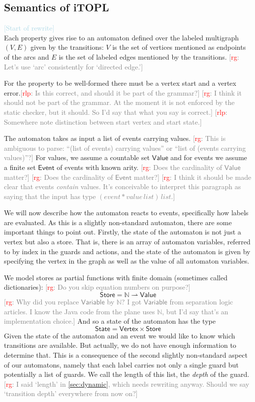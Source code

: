 \documentclass[preprint]{sigplanconf} %
\newcommand{\note}[2]{\textcolor{gray}{[\textcolor{red}{#1}: #2]}}
\newcommand{\rg}[1]{\note{rg}{#1}}
\newcommand{\rlp}[1]{\note{rlp}{#1}}
\newcommand{\N}{\ensuremath{\mathbb{N}}}
\newcommand{\pmap}{\rightharpoonup}
\newcommand{\set}[1]{\ensuremath{\mathsf{#1}}}
\theoremstyle{definition}
\theoremstyle{remark}
\begin{document}
\subsection{Semantics of iTOPL}\label{sec:semantics.itopl} %
\textcolor{lightblue}{[Start of rewrite]}\\
Each property gives rise to an automaton defined over the labeled multigraph $(V, E)$ given
by the transitions: $V$ is the set of vertices mentioned as endpoints of
the arcs and $E$ is the set of labeled edges mentioned by the
transitions.
\rg{Let's use `arc' consistently for `directed edge.'}

For the property to be well-formed there must be a vertex start and a
vertex error.\rlp{Is this correct, and should it be part of the grammar?}
\rg{I think it should not be part of the grammar.
At the moment it is not enforced by the static checker, but it should.
So I'd say that what you say is correct.}
\rlp{Somewhere note distinction between start vertex and start
  state.}

The automaton takes as input a list of events carrying values.
\rg{This is ambiguous to parse: ``(list of events) carrying values'' or ``list of (events carrying values)''?}
For values, we assume a countable set \set{Value} and for events we assume
a finite set \set{Event} of events with known arity.
\rg{Does the cardinality of \set{Value} matter?}
\rg{Does the cardinality of \set{Event} matter?}
\rg{I think it should be made clear that events \emph{contain} values.
It's conceivable to interpret this paragraph as saying that the input has type $(\mathit{event}*\mathit{value}\,\mathit{list})\,\mathit{list}$.}

We will now describe how the automaton reacts to events, specifically
how labels are evaluated. As this is a slightly non-standard
automaton, there are some important things to point out. Firstly, the
state of the automaton is not just a vertex but also a store. 
That is, there is an array of automaton variables, referred to by
index in the guards and actions, and the state of the automaton is
given by specifying the vertex in the graph as well as the value of
all automaton variables.

We model stores as partial functions with finite domain (sometimes called dictionaries):
\rg{Do you skip equation numbers on purpose?}
\[
\set{Store} = \N \pmap \set{Value}
\]
\rg{Why did you replace \set{Variable} by $\N$?
I got \set{Variable} from separation logic articles.
I know the Java code from the plane uses $\N$, but I'd say that's an implementation choice.}
And so a state of the automaton has the type
\[
\set{State} = \set{Vertex}\times\set{Store}
\]
Given the state of the automaton and an event we would like to know
which transitions are available. But actually, we do not have enough
information to determine that. This is a consequence of the second
slightly non-standard aspect of our automatons, namely that each label
carries not only a single guard but potentially a list of guards.
We call the length of this list, the \emph{depth} of the guard.
\rg{I said `length' in \autoref{sec:dynamic}, which needs rewriting anyway.
Should we say `transition depth' everywhere from now on?}
\end{document}
